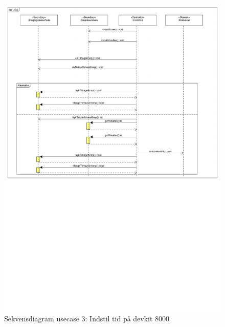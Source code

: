 \begin{figure}[H]
	\caption{Sekvensdiagram usecase 3: Indstil tid på devkit 8000}
	\label{SD:UC3-devkit}
	\includegraphics[scale=0.6,trim=10 400 100 0]{Applikationsmodel_UC3/SD_UC3}
\end{figure}

